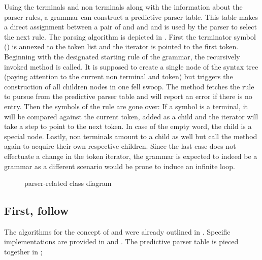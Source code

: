 Using the terminals and non terminals along with the information about the parser rules, a grammar can construct a predictive parser table. This table makes a direct assignment between a pair of  and  and  and is used by the parser to select the next rule. The parsing algorithm is depicted in . First the terminator symbol (\textterminal{\$}) is annexed to the token list and the iterator is pointed to the first token. Beginning with the designated starting rule of the grammar, the recursively invoked  method is called. It is supposed to create a single node of the syntax tree (paying attention to the current non terminal and token) but triggers the construction of all children nodes in one fell swoop. The  method fetches the rule to pursue from the predictive parser table and will report an error if there is no entry. Then the symbols of the rule are gone over: If a symbol is a terminal, it will be compared against the current token, added as a child and the iterator will take a step to point to the next token. In case of the empty word, the child is a special \textemph{\straightepsilon{}} node. Lastly, non terminals amount to a child as well but call the  method again to acquire their own respective children. Since the last case does not effectuate a change in the token iterator, the grammar is expected to indeed be a \textlang{} grammar as a different scenario would be prone to induce an infinite loop.

\begin{figure}[!h]
	\centering

	

	\caption{parser-related class diagram}
	\label{fig:class_parser}
\end{figure}

\subsection{First, follow}

The algorithms for the concept of  and  were already outlined in . Specific  implementations are provided in  and . The predictive parser table is pieced together in ;



